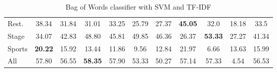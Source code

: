 \begin{table}[]
{\begin{tabular}{@{}lcccccccccc@{}}
		\multicolumn{1}{l|}{Rest.}      & 38.34                      & 31.84                     & 31.01                     & 33.25                          & 25.79                        & 27.37                     & \textbf{45.05}             & 32.0                      & 18.18                      & 33.5                   \\
		\multicolumn{1}{l|}{Stage}      & 34.07                       & 42.83                     & 48.80                    & 45.81                          & 49.85                        & 46.36                     & 26.37                     & \textbf{53.33}            & 27.27                      & 41.34                   \\
		\multicolumn{1}{l|}{Sports}     & \textbf{20.22}                      & 15.92                      & 13.44                    & 11.86                          & 9.56                        & 12.84                     & 21.97                      & 6.66                     & 13.63             & 15.99                    \\
		\multicolumn{1}{l|}{All}        & 57.80                      & 56.55                     & \textbf{58.35}            & 57.90                          & 53.33                        & 50.27                     & 57.14                     & 57.33                     & 4.54                      & 56.53                       
	\end{tabular}%
}
	\caption{Bag of Words classifier with SVM and TF-IDF}
	\label{tab:bow}
\end{table}
\begin{table}[]
	\centering
	\caption{Average number of tokens per review for each domain in each split}
\end{table}
